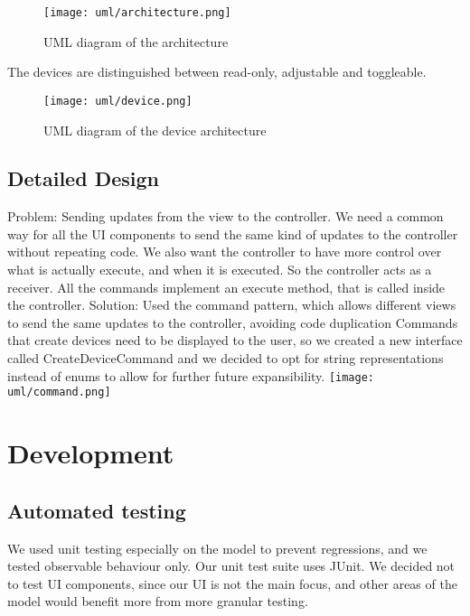 \documentclass[a4paper,12pt]{report}
\begin{document}
\begin{figure}[H]
\centering{}
\texttt{[image: uml/architecture.png]}
\caption{UML diagram of the architecture}
\label{uml:architecture}
\end{figure}

The devices are distinguished between read-only, adjustable and toggleable.

\begin{figure}[H]
\centering{}
\texttt{[image: uml/device.png]}
\caption{UML diagram of the device architecture}
\label{uml:device}
\end{figure}

\section{Detailed Design}
Problem: Sending updates from the view to the controller. 
We need a common way for all the UI components to send the same kind of updates to the controller without repeating code.
We also want the controller to have more control over what is actually execute, and when it is executed. So the controller acts as a receiver.
All the commands implement an execute method, that is called inside the controller.
Solution: Used the command pattern, which allows 
different views to send the same updates to the controller, avoiding code duplication
Commands that create devices need to be displayed to the user, so we created a new interface called CreateDeviceCommand
and we decided to opt for string representations instead of enums to allow for further future expansibility.
\newline
\texttt{[image: uml/command.png]}







\chapter{Development}
\section{Automated testing}
We used unit testing especially on the model to prevent regressions, and we tested observable behaviour only.
Our unit test suite uses JUnit.
We decided not to test UI components, since our UI is not the main focus,
and other areas of the model would benefit more from more granular testing. 
\end{document}

